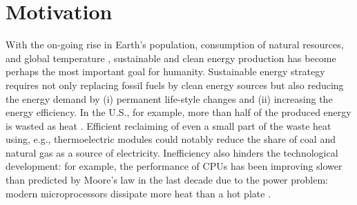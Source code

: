 
\section{Motivation}



With the on-going rise in Earth's population, consumption of natural resources, and global temperature \cite{}, sustainable and clean energy production has become perhaps the most important goal for humanity. Sustainable energy strategy requires not only replacing fossil fuels by clean energy sources but also reducing the energy demand by (i) permanent life-style changes and (ii) increasing the energy efficiency. In the U.S., for example, more than half of the produced energy is wasted as heat \cite{llnl13}. Efficient reclaiming of even a small part of the waste heat using, e.g., thermoelectric modules could notably reduce the share of coal and natural gas as a source of electricity. Inefficiency also hinders the technological development: for example, the performance of CPUs has been improving slower than predicted by Moore's law in the last decade due to the power problem: modern microprocessors dissipate more heat than a hot plate \cite{pop06_ieee}. %




